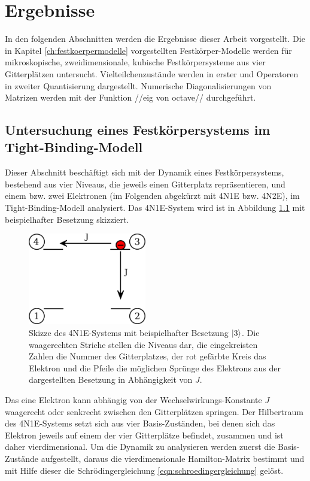 \chapter{Ergebnisse}

In den folgenden Abschnitten werden die Ergebnisse dieser Arbeit vorgestellt.
Die in Kapitel \ref{ch:festkoerpermodelle} vorgestellten Festkörper-Modelle werden für mikroskopische, zweidimensionale, kubische Festkörpersysteme aus vier Gitterplätzen untersucht.
Vielteilchenzustände werden in erster und Operatoren in zweiter Quantisierung dargestellt.
Numerische Diagonalisierungen von Matrizen werden mit der Funktion //eig von octave// durchgeführt.

\section{Untersuchung eines Festkörpersystems im Tight-Binding-Modell}
\label{sec:untersuchungtb}

Dieser Abschnitt beschäftigt sich mit der Dynamik eines Festkörpersystems, bestehend aus vier Niveaus, die jeweils einen Gitterplatz repräsentieren, und einem bzw. zwei Elektronen (im Folgenden abgekürzt mit 4N1E bzw. 4N2E),
im Tight-Binding-Modell analysiert. Das 4N1E-System wird ist in Abbildung \ref{fig:vierniveausystem} mit beispielhafter Besetzung skizziert.

\begin{figure}
  \centering
  \includegraphics[height = 4cm]{Graphiken/vier_niveau_system.pdf}
  \caption{Skizze des 4N1E-Systems mit beispielhafter Besetzung $\ket{3}$. Die waagerechten Striche stellen die Niveaus dar, die eingekreisten Zahlen die Nummer des Gitterplatzes, der rot gefärbte Kreis das Elektron
  und die Pfeile die möglichen Sprünge des Elektrons aus der dargestellten Besetzung in Abhängigkeit von $J$.}
  \label{fig:vierniveausystem}
\end{figure}

Das eine Elektron kann abhängig von der Wechselwirkungs-Konstante $J$ waagerecht oder senkrecht zwischen den Gitterplätzen springen.
Der Hilbertraum des 4N1E-Systems setzt sich aus vier Basis-Zuständen, bei denen sich das Elektron jeweils auf einem der vier Gitterplätze befindet, zusammen und ist daher vierdimensional.
Um die Dynamik zu analysieren werden zuerst die Basis-Zustände aufgestellt, daraus die vierdimensionale Hamilton-Matrix bestimmt und mit Hilfe dieser die Schrödingergleichung \ref{eqn:schroedingergleichung} gelöst.

